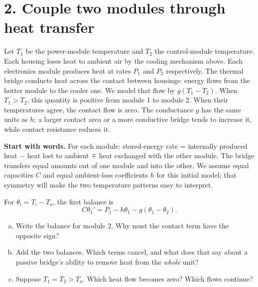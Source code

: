 \documentclass[10pt,letterpaper]{article}
\newcommand{\work}[1]{\vspace{#1}}
\begin{document}
\newpage
\section*{2. Couple two modules through heat transfer}
Let $T_1$ be the power-module temperature and $T_2$ the control-module temperature. Each housing loses heat to ambient air by the cooling mechanism above. Each electronics module produces heat at rates $P_1$ and $P_2$ respectively. The thermal bridge conducts heat across the contact between housings: energy flows from the hotter module to the cooler one. We model that flow by $g(T_1-T_2)$. When $T_1>T_2$, this quantity is positive from module 1 to module 2. When their temperatures agree, the contact flow is zero. The conductance $g$ has the same units as $h$; a larger contact area or a more conductive bridge tends to increase it, while contact resistance reduces it.

\begin{center}
\end{center}

\textbf{Start with words.} For each module: stored-energy rate = internally produced heat $-$ heat lost to ambient $\mp$ heat exchanged with the other module. The bridge transfers equal amounts out of one module and into the other. We assume equal capacities $C$ and equal ambient-loss coefficients $h$ for this initial model; that symmetry will make the two temperature patterns easy to interpret.

For $\theta_i=T_i-T_a$, the first balance is
\[
C\theta_1'=P_1-h\theta_1-g(\theta_1-\theta_2).
\]
\begin{enumerate}[a.,leftmargin=*]
\item Write the balance for module 2. Why must the contact term have the opposite sign?\work{0.40in}
\item Add the two balances. Which terms cancel, and what does that say about a passive bridge's ability to remove heat from the \emph{whole} unit?\work{0.46in}
\item Suppose $T_1=T_2>T_a$. Which heat flow becomes zero? Which flows continue?\work{0.32in}
\end{enumerate}
\end{document}
